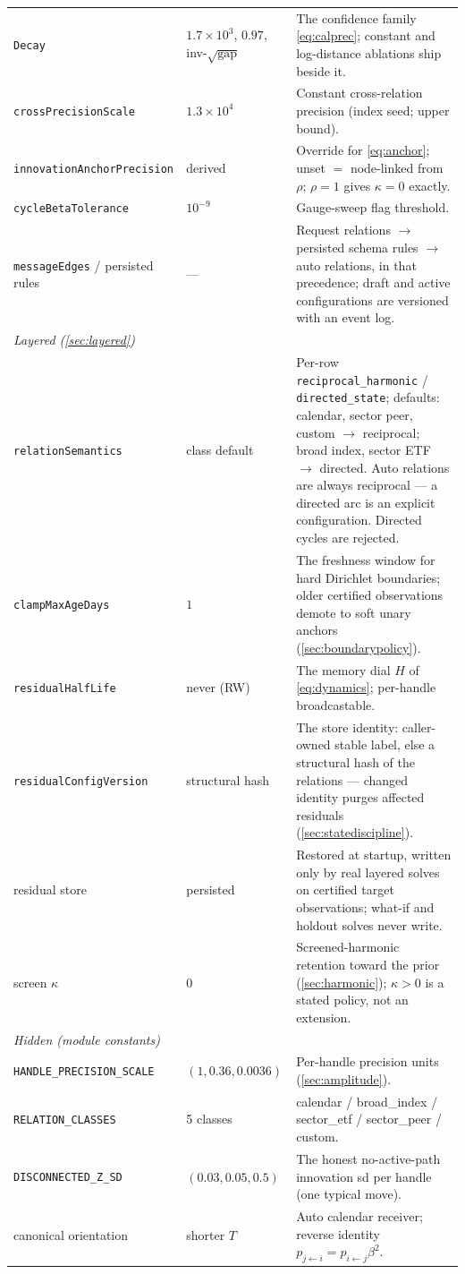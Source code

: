 \documentclass[11pt]{article}
\begin{document}
\begin{longtable}{p{}p{}p{}}
\texttt{Decay} & $1.7{\times}10^3$, $0.97$, inv-$\sqrt{\text{gap}}$ &
The confidence family \eqref{eq:calprec}; constant and log-distance
ablations ship beside it.\\
\texttt{crossPrecisionScale} & $1.3\times10^4$ & Constant cross-relation
precision (index seed; upper bound).\\
\texttt{innovationAnchorPrecision} & derived & Override for
\eqref{eq:anchor}; unset $=$ node-linked from $\rho$; $\rho=1$ gives
$\kappa=0$ exactly.\\
\texttt{cycleBetaTolerance} & $10^{-9}$ & Gauge-sweep flag threshold.\\
\texttt{messageEdges} / persisted rules & --- & Request relations $\to$
persisted schema rules $\to$ auto relations, in that precedence; draft
and active configurations are versioned with an event log.\\
\midrule
\multicolumn{3}{l}{\emph{Layered (\cref{sec:layered})}}\\ \midrule
\texttt{relationSemantics} & class default & Per-row
\texttt{reciprocal\_harmonic} / \texttt{directed\_state}; defaults:
calendar, sector peer, custom $\to$ reciprocal; broad index, sector ETF
$\to$ directed.  Auto relations are always reciprocal --- a directed arc
is an explicit configuration.  Directed cycles are rejected.\\
\texttt{clampMaxAgeDays} & $1$ & The freshness window for hard Dirichlet
boundaries; older certified observations demote to soft unary anchors
(\cref{sec:boundarypolicy}).\\
\texttt{residualHalfLife} & never (RW) & The memory dial $H$ of
\eqref{eq:dynamics}; per-handle broadcastable.\\
\texttt{residualConfigVersion} & structural hash & The store identity:
caller-owned stable label, else a structural hash of the relations ---
changed identity purges affected residuals
(\cref{sec:statediscipline}).\\
residual store & persisted & Restored at startup, written only by real
layered solves on certified target observations; what-if and holdout
solves never write.\\
screen $\kappa$ & $0$ & Screened-harmonic retention toward the prior
(\cref{sec:harmonic}); $\kappa>0$ is a stated policy, not an extension.\\
\midrule
\multicolumn{3}{l}{\emph{Hidden (module constants)}}\\ \midrule
\texttt{HANDLE\_PRECISION\_SCALE} & $(1,0.36,0.0036)$ & Per-handle
precision units (\cref{sec:amplitude}).\\
\texttt{RELATION\_CLASSES} & 5 classes & calendar / broad\_index /
sector\_etf / sector\_peer / custom.\\
\texttt{DISCONNECTED\_Z\_SD} & $(0.03,0.05,0.5)$ & The honest
no-active-path innovation sd per handle (one typical move).\\
canonical orientation & shorter $T$ & Auto calendar receiver; reverse
identity $p_{j\leftarrow i}=p_{i\leftarrow j}\beta^2$.\\
\bottomrule
\end{longtable}
\endgroup
\end{document}
